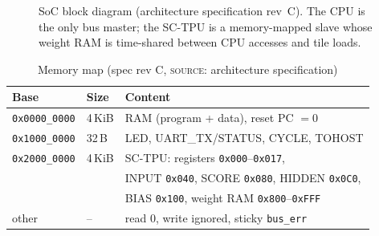 \documentclass[conference]{IEEEtran}
\newcommand{\lbl}[1]{\textsc{#1}}    %
\begin{document}
\begin{figure}[!t]
\caption{SoC block diagram (architecture specification rev~C). The CPU is the
only bus master; the SC-TPU is a memory-mapped slave whose weight RAM is
time-shared between CPU accesses and tile loads.}
\label{fig:soc}
\end{figure}

\begin{table}[!t]
\centering
\caption{Memory map (spec rev C, \lbl{source}: architecture specification)}
\label{tab:memmap}
\footnotesize
\setlength{\tabcolsep}{2.2pt}
\begin{tabular}{@{}lll@{}}
\toprule
Base & Size & Content \\
\midrule
\texttt{0x0000\_0000} & 4\,KiB & RAM (program + data), reset PC $=0$ \\
\texttt{0x1000\_0000} & 32\,B & LED, UART\_TX/STATUS, CYCLE, TOHOST \\
\texttt{0x2000\_0000} & 4\,KiB & SC-TPU: registers \texttt{0x000}--\texttt{0x017}, \\
 & & INPUT \texttt{0x040}, SCORE \texttt{0x080}, HIDDEN \texttt{0x0C0}, \\
 & & BIAS \texttt{0x100}, weight RAM \texttt{0x800}--\texttt{0xFFF} \\
other & -- & read 0, write ignored, sticky \texttt{bus\_err} \\
\bottomrule
\end{tabular}
\end{table}
\end{document}
